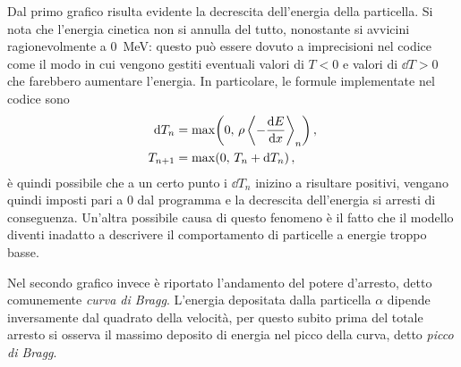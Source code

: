         Dal primo grafico risulta evidente la decrescita dell'energia della particella. Si nota che l'energia cinetica non si annulla del tutto, nonostante si avvicini ragionevolmente a \SI{0}{\mega\eV}: questo può essere dovuto a imprecisioni nel codice come il modo in cui vengono gestiti eventuali valori di $T < 0$ e valori di $\dd{T} > \num{0}$ che farebbero aumentare l'energia. In particolare, le formule implementate nel codice sono
        \begin{align*}
            \dd{T_n} &= \max\!\pqty{0,\,\rho\,{\left\langle - \dv{E}{x} \right\rangle}_n} \mycomma\\
            T_{n+1} &= \max\!\pqty{0,\,T_n + \dd{T_n}}\mycomma
        \end{align*}
        è quindi possibile che a un certo punto i $\dd{T_n}$ inizino a risultare positivi, vengano quindi imposti pari a \num{0} dal programma e la decrescita dell'energia si arresti di conseguenza. Un'altra possibile causa di questo fenomeno è il fatto che il modello diventi inadatto a descrivere il comportamento di particelle a energie troppo basse.

        Nel secondo grafico invece è riportato l'andamento del potere d'arresto, detto comunemente \emph{curva di Bragg}. L'energia depositata dalla particella $\alpha$ dipende inversamente dal quadrato della velocità, per questo subito prima del totale arresto si osserva il massimo deposito di energia nel picco della curva, detto \emph{picco di Bragg}.
